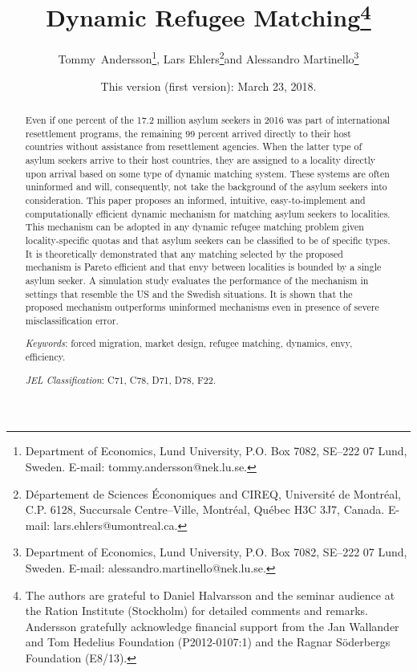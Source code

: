\documentclass[12pt,fleqn]{article}
\begin{document}
\title{\textbf{Dynamic Refugee Matching}\footnote{The authors are grateful to Daniel Halvarsson and the seminar audience at the Ration Institute (Stockholm) for detailed comments and remarks. Andersson gratefully acknowledge financial support from the Jan Wallander and Tom Hedelius Foundation (P2012-0107:1) and the Ragnar S\"oderbergs Foundation (E8/13).}}

\author{Tommy~Andersson\footnote{Department of Economics, Lund University, P.O. Box 7082, SE--222 07 Lund, Sweden. E-mail: tommy.andersson@nek.lu.se.}, Lars Ehlers\footnote{D\'epartement de Sciences \'Economiques and CIREQ, Universit\'e de Montr\'eal, C.P. 6128, Succursale Centre--Ville, Montr\'eal, Qu\'ebec H3C
3J7, Canada. E-mail: lars.ehlers@umontreal.ca.}\space\space and Alessandro Martinello\footnote{Department of Economics, Lund University, P.O. Box 7082, SE--222 07 Lund, Sweden. E-mail: alessandro.martinello@nek.lu.se.}}

\date{\small{This version (first version): March 23, 2018.}}

\maketitle
\vspace*{-4mm}
\begin{abstract}
\noindent Even if one percent of the 17.2 million asylum seekers in 2016 was part of international resettlement programs, the remaining 99 percent arrived directly to their host countries without assistance from resettlement agencies. When the latter type of asylum seekers arrive to their host countries, they are assigned to a locality directly upon arrival based on some type of dynamic matching system. These systems are often uninformed and will, consequently, not take the background of the asylum seekers into consideration. This paper proposes an informed, intuitive, easy-to-implement and computationally efficient dynamic mechanism for matching asylum seekers to localities. This mechanism can be adopted in any dynamic refugee matching problem given locality-specific quotas and that asylum seekers can be classified to be of specific types. It is theoretically demonstrated that any matching selected by the proposed mechanism is Pareto efficient and that envy between localities is bounded by a single asylum seeker. A simulation study evaluates the performance of the mechanism in settings that resemble the US and the Swedish situations. It is shown that the proposed mechanism outperforms uninformed mechanisms even in presence of severe misclassification error.

\medskip

\noindent\emph{Keywords}: forced migration, market design, refugee matching, dynamics, envy, efficiency.

\medskip

\noindent\emph{JEL Classification}: C71, C78, D71, D78, F22.

\end{abstract}
\end{document}
